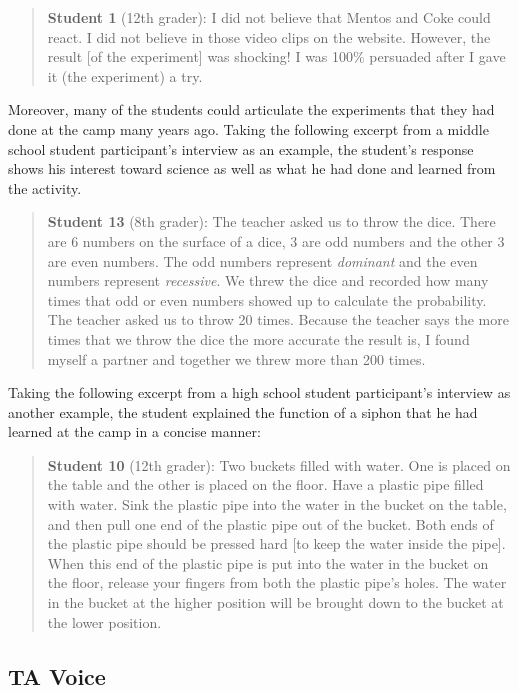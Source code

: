 \documentclass[11.5pt]{sig-alternate} %
\begin{document}
\begin{large}
\begin{quote}
\textbf{Student 1} (12th grader): I did not believe that Mentos and Coke could react. I did not believe in those video clips on the website. However, the result [of the experiment] was shocking! I was 100\% persuaded after I gave it (the experiment) a try.
\end{quote}

Moreover, many of the students could articulate the experiments that they had done at the camp many years ago. Taking the following excerpt from a middle school student participant’s interview as an example, the student’s response shows his interest toward science as well as what he had done and learned from the activity.

\begin{quote}
\textbf{Student 13} (8th grader): The teacher asked us to throw the dice. There are 6 numbers on the surface of a dice, 3 are odd numbers and the other 3 are even numbers. The odd numbers represent \textit{dominant} and the even numbers represent \textit{recessive}. We threw the dice and recorded how many times that odd or even numbers showed up to calculate the probability. The teacher asked us to throw 20 times. Because the teacher says the more times that we throw the dice the more accurate the result is, I found myself a partner and together we threw more than 200 times.
\end{quote}

Taking the following excerpt from a high school student participant’s interview as another example, the student explained the function of a siphon that he had learned at the camp in a concise manner:

 \begin{quote}
\textbf{Student 10} (12th grader): Two buckets filled with water. One is placed on the table and the other is placed on the floor. Have a plastic pipe filled with water. Sink the plastic pipe into the water in the bucket on the table, and then pull one end of the plastic pipe out of the bucket. Both ends of the plastic pipe should be pressed hard [to keep the water inside the pipe]. When this end of the plastic pipe is put into the water in the bucket on the floor, release your fingers from both the plastic pipe’s holes. The water in the bucket at the higher position will be brought down to the bucket at the lower position.
\end{quote}

\subsection*{TA Voice}


\end{large}
\end{document}

